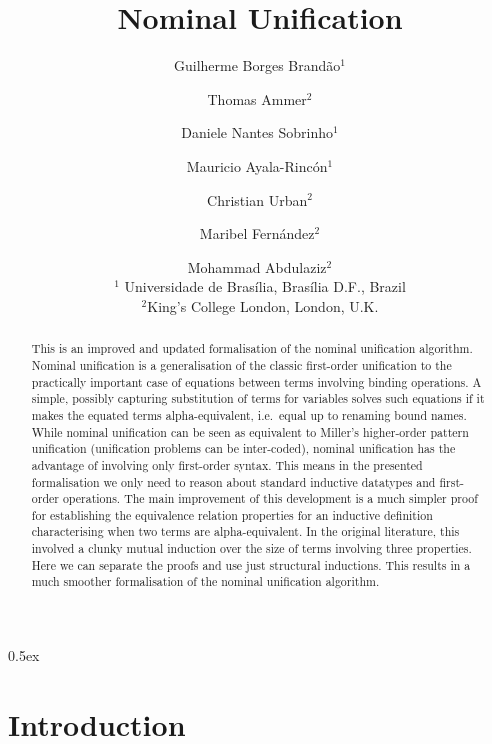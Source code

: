 \documentclass[11pt,a4paper]{article}
\begin{document}
\title{Nominal Unification}
\author{Guilherme Borges Brand\~ao$^1$ \and Thomas Ammer$^2$ \and Daniele Nantes Sobrinho$^1$ \and Mauricio Ayala-Rinc\'on$^1$ \and  Christian Urban$^2$ \and Maribel Fern\'andez$^2$ \and Mohammad Abdulaziz$^2$\\[2mm]
\mbox{}$^1$ Universidade de Bras\'ilia, Bras\'ilia D.F., Brazil \\[1mm]
\mbox{}$^2$King's College London, London, U.K.
 }

\maketitle

\begin{abstract}
  \noindent
  This is an improved and updated formalisation of the nominal
  unification algorithm.  Nominal unification is a generalisation of
  the classic first-order unification to the practically important
  case of equations between terms involving binding operations. A
  simple, possibly capturing substitution of terms for variables
  solves such equations if it makes the equated terms
  alpha-equivalent, i.e.~equal up to renaming bound names. While
  nominal unification can be seen as equivalent to Miller's
  higher-order pattern unification (unification problems can be inter-coded),
  nominal unification has the advantage of involving only first-order
  syntax. This means in the presented formalisation we only need to
  reason about standard inductive datatypes and first-order
  operations. The main improvement of this development is a much
  simpler proof for establishing the equivalence relation properties
  for an inductive definition characterising when two terms are
  alpha-equivalent. In the original literature, this involved a clunky
  mutual induction over the size of terms involving three properties. Here 
  we can separate the proofs and use just structural inductions. This
  results in a much smoother formalisation of the nominal
  unification algorithm.

\end{abstract}
\tableofcontents

\parindent 0pt\parskip 0.5ex


\section{Introduction}
\end{document}
